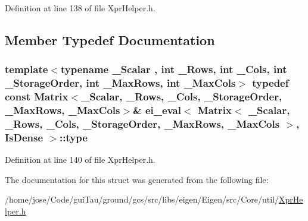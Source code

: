 Definition at line 138 of file Xpr\-Helper.\-h.



\subsection{Member Typedef Documentation}
\hypertarget{structei__eval_3_01_matrix_3_01___scalar_00_01___rows_00_01___cols_00_01___storage_order_00_01__1037d2a498088b119b5d3833e22bfc54_adcfa88c97095bc9228f69a7161c34e01}{
\subsubsection[{type}]{\setlength{\rightskip}{0pt plus 5cm}template$<$typename \-\_\-\-Scalar , int \-\_\-\-Rows, int \-\_\-\-Cols, int \-\_\-\-Storage\-Order, int \-\_\-\-Max\-Rows, int \-\_\-\-Max\-Cols$>$ typedef const {\bf Matrix}$<$\-\_\-\-Scalar, \-\_\-\-Rows, \-\_\-\-Cols, \-\_\-\-Storage\-Order, \-\_\-\-Max\-Rows, \-\_\-\-Max\-Cols$>$\& {\bf ei\-\_\-eval}$<$ {\bf Matrix}$<$ \-\_\-\-Scalar, \-\_\-\-Rows, \-\_\-\-Cols, \-\_\-\-Storage\-Order, \-\_\-\-Max\-Rows, \-\_\-\-Max\-Cols $>$, {\bf Is\-Dense} $>$\-::{\bf type}}}\label{structei__eval_3_01_matrix_3_01___scalar_00_01___rows_00_01___cols_00_01___storage_order_00_01__1037d2a498088b119b5d3833e22bfc54_adcfa88c97095bc9228f69a7161c34e01}


Definition at line 140 of file Xpr\-Helper.\-h.



The documentation for this struct was generated from the following file\-:\begin{DoxyCompactItemize}
\item 
/home/jose/\-Code/gui\-Tau/ground/gcs/src/libs/eigen/\-Eigen/src/\-Core/util/\hyperlink{_xpr_helper_8h}{Xpr\-Helper.\-h}\end{DoxyCompactItemize}
